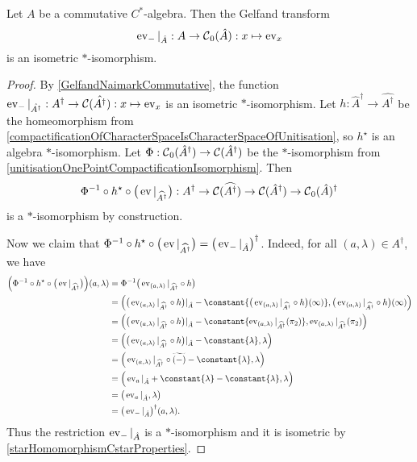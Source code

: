 \begin{theorem} \label{nonUnitalGelfandNaimarkCommutative}
Let $A$ be a commutative $C^*$-algebra. Then the Gelfand transform
\[ \operatorname{ev}_{-}|_{\hat{A}}: A\to\operatorname{\mathcal{C}}_0(\hat{A}): x\mapsto \operatorname{ev}_{x} \]
is an isometric $*$-isomorphism.
\end{theorem}
\begin{proof}
By \ref{GelfandNaimarkCommutative}, the function $\operatorname{ev}_{-}|_{\hat{A^\dagger}}: A^\dagger\to\operatorname{\mathcal{C}}(\hat{A^\dagger}): x\mapsto \operatorname{ev}_{x}$ is an isometric $*$-isomorphism. Let $h: \hat{A}^\dagger \to \widehat{A^\dagger}$ be the homeomorphism from \ref{compactificationOfCharacterSpaceIsCharacterSpaceOfUnitisation}, so $h^\star$ is an algebra $*$-isomorphism. Let $\Phi: \operatorname{\mathcal{C}}_0(\hat{A}^\dagger) \to \operatorname{\mathcal{C}}(\hat{A}^\dagger)$ be the $*$-isomorphism from \ref{unitisationOnePointCompactificationIsomorphism}. Then
\[ \Phi^{-1}\circ h^\star\circ \big(\operatorname{ev}|_{\widehat{A^\dagger}}\big): A^\dagger \to \operatorname{\mathcal{C}}(\widehat{A^\dagger}) \to \operatorname{\mathcal{C}}(\hat{A}^\dagger) \to \operatorname{\mathcal{C}}_0(\hat{A})^\dagger \]
is a $*$-isomorphism by construction.

Now we claim that $\Phi^{-1}\circ h^\star\circ \big(\operatorname{ev}|_{\widehat{A^\dagger}}\big) = \big(\operatorname{ev}_{-}|_{\hat{A}}\big)^\dagger$. Indeed, for all $(a, \lambda)\in A^\dagger$, we have
\begin{align*}
\Big(\Phi^{-1}\circ h^\star\circ \big(\evalMap|_{\widehat{A^\dagger}}\big)\Big)(a, \lambda) &= \Phi^{-1}\big(\evalMap_{(a, \lambda)}|_{\widehat{A^\dagger}}\circ h\big) \\
&= \Big(\big(\evalMap_{(a, \lambda)}|_{\widehat{A^\dagger}}\circ h\big)|_{\hat{A}} - \constant{\big(\evalMap_{(a, \lambda)}|_{\widehat{A^\dagger}}\circ h\big)(\infty)}, \big(\evalMap_{(a, \lambda)}|_{\widehat{A^\dagger}}\circ h\big)(\infty)\Big) \\
&= \Big(\big(\evalMap_{(a, \lambda)}|_{\widehat{A^\dagger}}\circ h\big)|_{\hat{A}} - \constant{\evalMap_{(a, \lambda)}|_{\widehat{A^\dagger}}(\proj_2)}, \evalMap_{(a, \lambda)}|_{\widehat{A^\dagger}}(\proj_2)\Big) \\
&= \Big(\big(\evalMap_{(a, \lambda)}|_{\widehat{A^\dagger}}\circ h\big)|_{\hat{A}} - \constant{\lambda}, \lambda\Big) \\
&= \Big(\evalMap_{(a, \lambda)}|_{\widehat{A^\dagger}}\circ \widetilde{(-)} - \constant{\lambda}, \lambda\Big) \\
&= \Big(\evalMap_{a}|_{\hat{A}} + \constant{\lambda} - \constant{\lambda}, \lambda\Big) \\
&= \big(\evalMap_{a}|_{\hat{A}}, \lambda\big) \\
&= \big(\evalMap_{-}|_{\hat{A}}\big)^\dagger(a,\lambda).
\end{align*}
Thus the restriction $\operatorname{ev}_{-}|_{\hat{A}}$ is a $*$-isomorphism and it is isometric by \ref{starHomomorphismCstarProperties}.
\end{proof}




